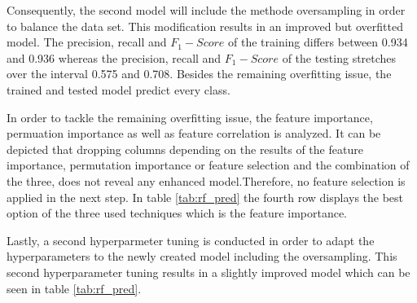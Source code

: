 Consequently, the second model will include the methode oversampling in order to balance the data set. This modification results in an improved but overfitted model. The precision, recall and $F_1-Score$ of the training differs between 0.934 and 0.936 whereas the precision, recall and $F_1-Score$ of the testing stretches over the interval 0.575 and 0.708. Besides the remaining overfitting issue, the trained and tested model predict every class.

In order to tackle the remaining overfitting issue, the feature importance, permuation importance as well as feature correlation is analyzed.\cite{Piotri2020} It can be depicted that dropping columns depending on the results of the feature importance, permutation importance or feature selection and the combination of the three, does not reveal any enhanced model.Therefore, no feature selection is applied in the next step. In table \ref{tab:rf_pred} the fourth row displays the best option of the three used techniques which is the feature importance.

Lastly, a second hyperparmeter tuning is conducted in order to adapt the hyperparameters to the newly created model including the oversampling. 
This second hyperparameter tuning results in a slightly improved model which can be seen in table \ref{tab:rf_pred}.




